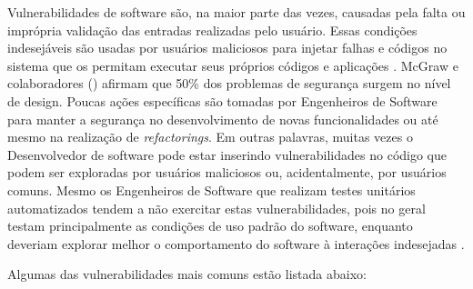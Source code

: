Vulnerabilidades de software são, na maior parte das vezes, causadas pela falta ou imprópria validação das entradas realizadas pelo usuário. Essas condições indesejáveis são usadas por usuários maliciosos para injetar falhas e códigos no sistema que os permitam executar seus próprios códigos e aplicações  \cite{jimenez2009}. McGraw e colaboradores (\citeyear{mcgraw2004}) afirmam que 50\% dos problemas de segurança surgem no nível de design. Poucas ações específicas são tomadas por Engenheiros de Software para manter a segurança no desenvolvimento de novas funcionalidades ou até mesmo na realização de \emph{refactorings}. Em outras palavras, muitas vezes o Desenvolvedor de software pode estar inserindo vulnerabilidades no código que podem ser exploradas por usuários maliciosos ou, acidentalmente, por usuários comuns. Mesmo os Engenheiros de Software que realizam testes unitários automatizados tendem a não exercitar estas vulnerabilidades, pois no geral testam principalmente as condições de uso padrão do software, enquanto deveriam explorar melhor o comportamento do software à interações indesejadas \cite{vries2006}.

%

Algumas das vulnerabilidades mais comuns estão listada abaixo:

%


